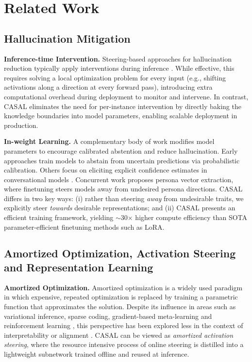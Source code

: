 \documentclass{article} %
\begin{document}
\section{Related Work}
\label{sec:related_work}



\subsection{Hallucination Mitigation}

\textbf{Inference-time Intervention.} Steering-based approaches \citep{contrastive_activation_addition, turner2024steering} for hallucination reduction typically apply interventions during inference \citep{ferrando2025entity, calibratinguncertaintylinear, li2024inferencetimeinterventionelicitingtruthful,latentshallucination}. While effective, this requires solving a local optimization problem for every input (e.g., shifting activations along a direction at every forward pass), introducing extra computational overhead during deployment to monitor and intervene. In contrast, CASAL eliminates the need for per-instance intervention by directly baking the knowledge boundaries into model parameters, enabling scalable deployment in production.

\textbf{In-weight Learning.} A complementary body of work modifies model parameters to encourage calibrated abstention and reduce hallucination. Early approaches train models to abstain from uncertain predictions via probabilistic calibration. Others focus on eliciting explicit confidence estimates in conversational models \citep{KnowledgeBoundary, linguisticcalibration}. Concurrent work \citet{chen2025personavectors} proposes persona vector extraction, where finetuning steers models away from undesired persona directions. CASAL differs in two key ways: (i) rather than steering \textit{away} from undesirable traits, we explicitly steer \textit{towards} desirable representations; and (ii) CASAL presents an efficient training framework, yielding $\sim$30$\times$ higher compute efficiency than SOTA parameter-efficient finetuning methods such as LoRA.

\subsection{Amortized Optimization, Activation Steering and Representation Learning}

\textbf{Amortized Optimization.} Amortized optimization \citep{kingma2013auto, rezende2014stochastic, gershman2014amortized} is a widely used paradigm in which expensive, repeated optimization is replaced by training a parametric function that approximates the solution. Despite its influence in areas such as variational inference, sparse coding, gradient-based meta-learning and reinforcement learning \citep{amos2025tutorialamortizedoptimization, chen2021learningoptimizeprimerbenchmark}, this perspective has been explored less in the context of interpretability or alignment \citep{paulus2025advprompter}. CASAL can be viewed as \emph{amortized activation steering}, where the resource intensive process of online steering is distilled into a lightweight subnetwork trained offline and reused at inference.
\end{document}
